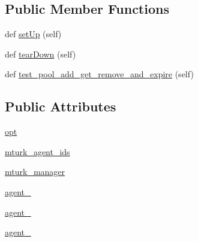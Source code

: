 \subsection*{Public Member Functions}
\begin{DoxyCompactItemize}
\item 
def \hyperlink{classparlai_1_1mturk_1_1core_1_1legacy__2018_1_1test_1_1test__mturk__manager_1_1TestMTurkManagerPoolHandling_adb1e5cce98e6cd43ea42f5cdb2f90d63}{set\+Up} (self)
\item 
def \hyperlink{classparlai_1_1mturk_1_1core_1_1legacy__2018_1_1test_1_1test__mturk__manager_1_1TestMTurkManagerPoolHandling_af8eb3ea18a31a150c098fd6c02cc09ae}{tear\+Down} (self)
\item 
def \hyperlink{classparlai_1_1mturk_1_1core_1_1legacy__2018_1_1test_1_1test__mturk__manager_1_1TestMTurkManagerPoolHandling_a87c02304efce79788098493d7c295ac3}{test\+\_\+pool\+\_\+add\+\_\+get\+\_\+remove\+\_\+and\+\_\+expire} (self)
\end{DoxyCompactItemize}
\subsection*{Public Attributes}
\begin{DoxyCompactItemize}
\item 
\hyperlink{classparlai_1_1mturk_1_1core_1_1legacy__2018_1_1test_1_1test__mturk__manager_1_1TestMTurkManagerPoolHandling_ad55be5e1eb796af694952deae9254be7}{opt}
\item 
\hyperlink{classparlai_1_1mturk_1_1core_1_1legacy__2018_1_1test_1_1test__mturk__manager_1_1TestMTurkManagerPoolHandling_a7256563b273f607300fc5221b8ecfacd}{mturk\+\_\+agent\+\_\+ids}
\item 
\hyperlink{classparlai_1_1mturk_1_1core_1_1legacy__2018_1_1test_1_1test__mturk__manager_1_1TestMTurkManagerPoolHandling_ab12015d92c056251302dba503df4a728}{mturk\+\_\+manager}
\item 
\hyperlink{classparlai_1_1mturk_1_1core_1_1legacy__2018_1_1test_1_1test__mturk__manager_1_1TestMTurkManagerPoolHandling_a9687ff918de01e0c3cbf9d913e73cecd}{agent\+\_}
\item 
\hyperlink{classparlai_1_1mturk_1_1core_1_1legacy__2018_1_1test_1_1test__mturk__manager_1_1TestMTurkManagerPoolHandling_ae4d91650b01d307c35397d62bdf06221}{agent\+\_}
\item 
\hyperlink{classparlai_1_1mturk_1_1core_1_1legacy__2018_1_1test_1_1test__mturk__manager_1_1TestMTurkManagerPoolHandling_ad1e669f8ee92919705e2a12e8552be87}{agent\+\_}
\end{DoxyCompactItemize}


